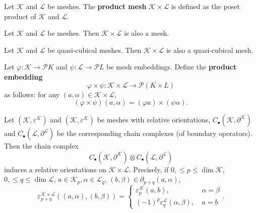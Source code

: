 \begin{definition}
  Let $\mathcal{K}$ and $\mathcal{L}$ be meshes.
  The \textbf{product mesh} $\mathcal{K} \times \mathcal{L}$ is defined as the
  poset product of $\mathcal{K}$ and $\mathcal{L}$.
\end{definition}
\begin{proposition}
  Let $\mathcal{K}$ and $\mathcal{L}$ be meshes.
  Then $\mathcal{K} \times \mathcal{L}$ is also a mesh.
\end{proposition}
\begin{proposition}
  Let $\mathcal{K}$ and $\mathcal{L}$ be quasi-cubical meshes.
  Then $\mathcal{K} \times \mathcal{L}$ is also a quasi-cubical mesh.
\end{proposition}
\begin{definition}
  Let $\varphi \colon \mathcal{K} \to \mathcal{P} K$ and
    $\psi \colon \mathcal{L} \to \mathcal{P} L$ be
  mesh embeddings.
  Define the \textbf{product embedding}
  \begin{equation}
    \varphi \times \psi \colon
    \mathcal{K} \times \mathcal{L} \to \mathcal{P} (K \times L)
  \end{equation}
  as follows: for any $(a, \alpha) \in \mathcal{K} \times \mathcal{L}$,
  \begin{equation}
    (\varphi \times \psi)(a, \alpha) = (\varphi a) \times (\psi \alpha).
  \end{equation}
\end{definition}
\begin{proposition}
  Let
    $(\mathcal{K}, \varepsilon^{\mathcal{K}})$ and
      $(\mathcal{K}, \varepsilon^{\mathcal{K}})$
      be meshes with relative orientations,
    $C_\bullet(\mathcal{K}, \partial^{\mathcal{K}})$ and
      $C_\bullet(\mathcal{L}, \partial^{\mathcal{L}})$
    be the corresponding chain complexes (of boundary operators).
  Then the chain complex
  \begin{equation}
    C_\bullet(\mathcal{K}, \partial^{\mathcal{K}}) \otimes
    C_\bullet(\mathcal{L}, \partial^{\mathcal{L}})
  \end{equation}
  induces a relative orientations on $\mathcal{K} \times \mathcal{L}$.
  Precisely, if $0, \leq p \leq \dim \mathcal{K}$,
  $0, \leq q \leq \dim \mathcal{L}$,
  $a \in \mathcal{K}_p, \alpha \in \mathcal{L}_{q}$,
  $(b, \beta) \in \partial_{p + q}(a, \alpha)$,
  \begin{equation}
    \varepsilon^{\mathcal{K} \times \mathcal{L}}_{p + q}(
      (a, \alpha), (b, \beta)) =
    \begin{cases}
      \varepsilon_p^{\mathcal{K}}(a, b),\ & \alpha = \beta \\
      (-1)^p \varepsilon_q^{\mathcal{L}}(\alpha, \beta),\ & a = b
    \end{cases}.
  \end{equation}
\end{proposition}

